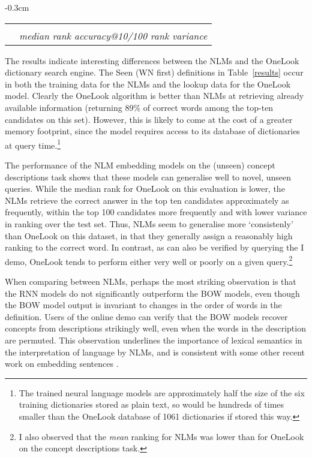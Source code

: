 \begin{table*}[ht]
\begin{adjustwidth}{-0.3cm}{}
{\begin{tabular}{r|ccc|ccc|ccc}
\hline 

\multicolumn{10}{c}{} \\
\multicolumn{4}{c}{}& \multicolumn{6}{|c|}{\emph{median rank \hspace{5mm}   accuracy@10/100 \hspace{5mm}   rank variance} } \\

\end{tabular}}
\caption{Performance of different reverse dictionary models in different evaluation settings. *Low variance in \emph{mult} models is due to consistently poor scores, so not highlighted.}
\label{results}
\end{adjustwidth}
\end{table*}


The results indicate interesting differences between the NLMs and the OneLook dictionary search engine. The Seen (WN first) definitions in Table~\ref{results} occur in both the training data for the NLMs and the lookup data for the OneLook model. Clearly the OneLook algorithm is better than NLMs at retrieving already available information (returning 89\% of  correct words among the top-ten candidates on this set). However, this is likely to come at the cost of a greater memory footprint, since the model requires access to its database of dictionaries at query time.\footnote{The trained neural language models are approximately half the size of the six training dictionaries stored as plain text, so would be hundreds of times smaller than the OneLook database of 1061 dictionaries if stored this way.}

The performance of the NLM embedding models on the (unseen) concept descriptions task shows that these models can generalise well to novel, unseen queries. While the median rank for OneLook on this evaluation is lower, the NLMs retrieve the correct answer in the top ten candidates approximately as frequently, within the top 100 candidates more frequently and with lower variance in ranking over the test set. Thus, NLMs seem to generalise more `consistenly' than OneLook on this dataset, in that they generally assign a reasonably high ranking to the correct word. In contrast, as can also be verified by querying the I demo, OneLook tends to perform either very well or poorly on a given query.\footnote{I also observed that the \emph{mean} ranking for NLMs was lower than for OneLook on the concept descriptions task.}

When comparing between NLMs, perhaps the most striking observation is that the RNN models do not significantly outperform the BOW models, even though the BOW model output is invariant to changes in the order of words in the definition. Users of the online demo can verify that the BOW models recover concepts from descriptions strikingly well, even when the words in the description are permuted. This observation underlines the importance of lexical semantics in the interpretation of language by NLMs, and is consistent with some other recent work on embedding sentences \citep{iyyer2015deep}.    


